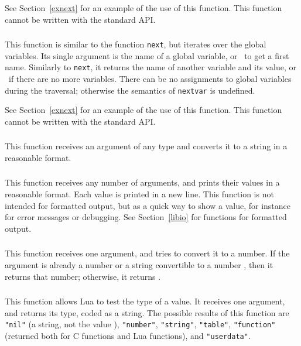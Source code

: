 See Section~\ref{exnext} for an example of the use of this function.
This function cannot be written with the standard API.

\subsubsection*{}
This function is similar to the function \verb'next',
but iterates over the global variables.
Its single argument is the name of a global variable,
or \nil\ to get a first name.
Similarly to \verb'next', it returns the name of another variable
and its value,
or \nil\ if there are no more variables.
There can be no assignments to global variables during the traversal;
otherwise the semantics of \verb|nextvar| is undefined.

See Section~\ref{exnext} for an example of the use of this function.
This function cannot be written with the standard API.

\subsubsection*{}
This function receives an argument of any type and
converts it to a string in a reasonable format.

\subsubsection*{}
This function receives any number of arguments,
and prints their values in a reasonable format.
Each value is printed in a new line.
This function is not intended for formatted output,
but as a quick way to show a value,
for instance for error messages or debugging.
See Section~\ref{libio} for functions for formatted output.

\subsubsection*{}
This function receives one argument,
and tries to convert it to a number.
If the argument is already a number or a string convertible
to a number , then it returns that number;
otherwise, it returns \nil.

\subsubsection*{}
This function allows Lua to test the type of a value.
It receives one argument, and returns its type, coded as a string.
The possible results of this function are
\verb'"nil"' (a string, not the value \nil),
\verb'"number"',
\verb'"string"',
\verb'"table"',
\verb'"function"' (returned both for C functions and Lua functions),
and \verb'"userdata"'.

